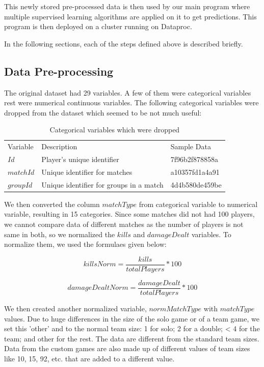 \documentclass[journal,twoside,web]{ieeecolor}
\begin{document}
This newly stored pre-processed data is then used by our main program where multiple supervised learning algorithms are applied on it to get predictions. This program is then deployed on a cluster running on Dataproc.

In the following sections, each of the steps defined above is described briefly.

\subsection{Data Pre-processing}
The original dataset had 29 variables. A few of them were categorical variables rest were numerical continuous variables. The following categorical variables were dropped from the dataset which seemed to be not much useful:

\begin{table}[h]
    \caption{Categorical variables which were dropped}
    \label{tab:cat_variables}
	\centering
    \begin{tabular}{l l l}
    \toprule
    \multirow{2}{*}{Variable} & \multirow{2}{*}{Description} & \multirow{2}{*}{Sample Data} \\ 
    && \\ \midrule
    $Id$ & Player's unique identifier & 7f96b2f878858a \\ \midrule
    $matchId$ & Unique identifier for matches & a10357fd1a4a91 \\ \midrule
    $groupId$ & Unique identifier for groups in a match & 4d4b580de459be  \\
    \bottomrule
    \end{tabular}
\end{table}

We then converted the column $matchType$ from categorical variable to numerical variable, resulting in 15 categories. Since some matches did not had 100 players, we cannot compare data of different matches as the number of players is not same in both, so we normalized the $kills$ and $damageDealt$ variables. To normalize them, we used the formulaes given below:

\[ killsNorm = \frac{kills}{totalPlayers} * 100 \]

\[ damageDealtNorm = \frac{damageDealt}{totalPlayers} * 100 \]

We then created another normalized variable, $normMatchType$ with $matchType$ values. Due to huge differences in the size of the solo game or of a team game, we set this 'other' and to the normal team size: 1 for solo; 2 for a double; < 4 for the team; and other for the rest. The data are different from the standard team sizes. Data from the custom games are also made up of different values of team sizes like 10, 15, 92, etc. that are added to a different value.
\end{document}
